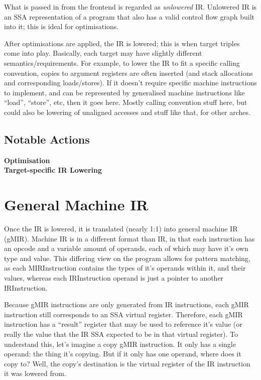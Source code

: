 \documentclass[12pt]{article}
\begin{document}
What is passed in from the frontend is regarded as \emph{unlowered} IR. Unlowered IR is an SSA representation of a program that also has a valid control flow graph built into it; this is ideal for optimisations.

After optimisations are applied, the IR is lowered; this is when target triples come into play. Basically, each target may have slightly different semantics/requirements. For example, to lower the IR to fit a specific calling convention, copies to argument registers are often inserted (and stack allocations and corresponding loads/stores). If it doesn't require specific machine instructions to implement, and can be represented by generalised machine instructions like ``load'', ``store'', etc, then it goes here. Mostly calling convention stuff here, but could also be lowering of unaligned accesses and stuff like that, for other arches.


\subsection{Notable Actions}
\label{subsec:ir:notable-actions}

\noindent\textbf{Optimisation}\\

\noindent\textbf{Target-specific IR Lowering}\\

\section{General Machine IR}
\label{sec:general-machine-ir}

Once the IR is lowered, it is translated (nearly 1:1) into general machine IR (gMIR). Machine IR is in a different format than IR, in that each instruction has an opcode and a variable amount of operands, each of which may have it's own type and value. This differing view on the program allows for pattern matching, as each MIRInstruction contains the types of it's operands within it, and their values, whereas each IRInstruction operand is just a pointer to another IRInstruction.

Because gMIR instructions are only generated from IR instructions, each gMIR instruction still corresponds to an SSA virtual register. Therefore, each gMIR instruction has a ``result'' register that may be used to reference it's value (or really the value that the IR SSA expected to be in that virtual register). To understand this, let's imagine a copy gMIR instruction. It only has a single operand: the thing it's copying. But if it only has one operand, where does it copy to? Well, the copy's destination is the virtual register of the IR instruction it was lowered from.
\end{document}
